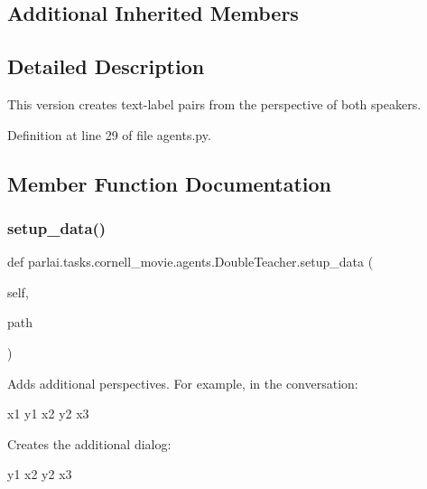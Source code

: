 \subsection*{Additional Inherited Members}


\subsection{Detailed Description}
\begin{DoxyVerb}This version creates text-label pairs from the perspective of both speakers.
\end{DoxyVerb}
 

Definition at line 29 of file agents.\+py.



\subsection{Member Function Documentation}
\mbox{\label{classparlai_1_1tasks_1_1cornell__movie_1_1agents_1_1DoubleTeacher_a329e24270a27f4c7d5b56d2b9c2aed8b}} 
\subsubsection{\texorpdfstring{setup\+\_\+data()}{setup\_data()}}
{\footnotesize\ttfamily def parlai.\+tasks.\+cornell\+\_\+movie.\+agents.\+Double\+Teacher.\+setup\+\_\+data (\begin{DoxyParamCaption}\item[{}]{self,  }\item[{}]{path }\end{DoxyParamCaption})}

\begin{DoxyVerb}Adds additional perspectives. For example, in the conversation:

x1 y1
x2 y2
x3

Creates the additional dialog:

y1 x2
y2 x3
\end{DoxyVerb}
 

